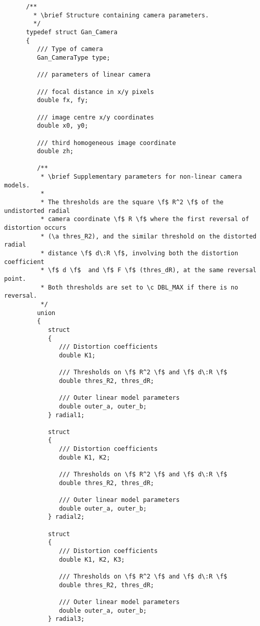 \begin{verbatim}
      /**
        * \brief Structure containing camera parameters.
        */
      typedef struct Gan_Camera
      {
         /// Type of camera
         Gan_CameraType type;

         /// parameters of linear camera

         /// focal distance in x/y pixels
         double fx, fy;

         /// image centre x/y coordinates
         double x0, y0;

         /// third homogeneous image coordinate
         double zh;

         /**
          * \brief Supplementary parameters for non-linear camera models.
          *
          * The thresholds are the square \f$ R^2 \f$ of the undistorted radial
          * camera coordinate \f$ R \f$ where the first reversal of distortion occurs
          * (\a thres_R2), and the similar threshold on the distorted radial
          * distance \f$ d\:R \f$, involving both the distortion coefficient
          * \f$ d \f$  and \f$ F \f$ (thres_dR), at the same reversal point.
          * Both thresholds are set to \c DBL_MAX if there is no reversal.
          */
         union
         {
            struct
            {
               /// Distortion coefficients
               double K1;
      
               /// Thresholds on \f$ R^2 \f$ and \f$ d\:R \f$
               double thres_R2, thres_dR;
      
               /// Outer linear model parameters
               double outer_a, outer_b;
            } radial1;
      
            struct
            {
               /// Distortion coefficients
               double K1, K2;
      
               /// Thresholds on \f$ R^2 \f$ and \f$ d\:R \f$
               double thres_R2, thres_dR;
      
               /// Outer linear model parameters
               double outer_a, outer_b;
            } radial2;
      
            struct
            {
               /// Distortion coefficients
               double K1, K2, K3;
      
               /// Thresholds on \f$ R^2 \f$ and \f$ d\:R \f$
               double thres_R2, thres_dR;
      
               /// Outer linear model parameters
               double outer_a, outer_b;
            } radial3;
      

\end{verbatim}
